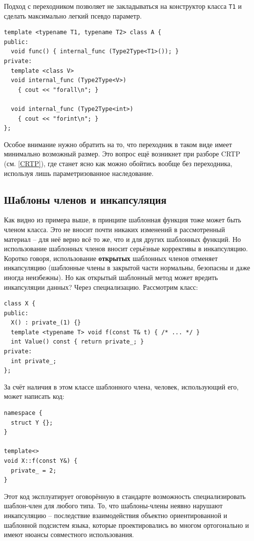 \documentclass[a4paper,12pt,oneside]{book}
\begin{document}
Подход с переходником позволяет не закладываться на конструктор класса \lstinline!T1! и сделать максимально легкий псевдо параметр.

\begin{lstlisting}
template <typename T1, typename T2> class A {
public:
  void func() { internal_func (Type2Type<T1>()); }
private:
  template <class V>
  void internal_func (Type2Type<V>)
    { cout << "forall\n"; }

  void internal_func (Type2Type<int>)
    { cout << "forint\n"; }
};
\end{lstlisting}

Особое внимание нужно обратить на то, что переходник в таком виде имеет минимально возможный размер. Это вопрос ещё возникнет при разборе CRTP (см. \ref{CRTP}), где станет ясно как можно обойтись вообще без переходника, используя лишь параметризованное наследование.

\subsection{Шаблоны членов и инкапсуляция}\label{TemplMembersEncapsulation}

Как видно из примера выше, в принципе шаблонная функция тоже может быть членом класса. Это не вносит почти никаких изменений в рассмотренный материал -- для неё верно всё то же, что и для других шаблонных функций. Но использование шаблонных членов вносит серьёзные коррективы в инкапсуляцию. Коротко говоря, использование \textbf{открытых} шаблонных членов отменяет инкапсуляцию (шаблонные члены в закрытой части нормальны, безопасны и даже иногда неизбежны). Но как открытый шаблонный метод может вредить инкапсуляции данных? Через специализацию. Рассмотрим класс:

\begin{lstlisting}
class X {
public:
  X() : private_(1) {}
  template <typename T> void f(const T& t) { /* ... */ }
  int Value() const { return private_; }
private:
  int private_;  
};
\end{lstlisting}

За счёт наличия в этом классе шаблонного члена, человек, использующий его, может написать код:

\begin{lstlisting}
namespace {
  struct Y {};
}

template<>
void X::f(const Y&) {
  private_ = 2;
}
\end{lstlisting}

Этот код эксплуатирует оговорённую в стандарте возможность специализировать шаблон-член для любого типа. То, что шаблоны-члены неявно нарушают инкапсуляцию -- последствие взаимодействия объектно ориентированной и шаблонной подсистем языка, которые проектировались во многом ортогонально и имеют нюансы совместного использования.
\end{document}
